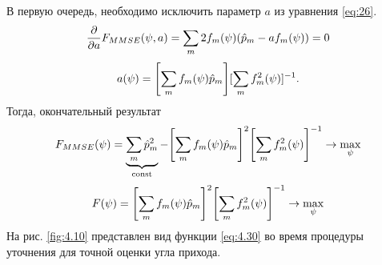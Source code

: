 В первую очередь, необходимо исключить параметр $a$ из уравнения \eqref{eq:26}.
\begin{equation}
    \pdv{a} F_{MMSE}(\psi, a) = \sum\limits_m 2f_m(\psi) (\hat p_m - a f_m(\psi)) = 0
\end{equation}
\begin{equation}
    a(\psi) = \qty[\sum\limits_m f_m(\psi) \hat p_m][\sum\limits_m f_m^2(\psi)]^{-1}.
\end{equation}
Тогда, окончательный результат
\begin{equation}
    F_{MMSE}(\psi)=\underbrace{\sum\limits_m \hat p_m^2}_{\text{const}} - \qty[\sum\limits_m f_m(\psi) \hat p_m]^2 \qty[\sum \limits_m f_m^2 (\psi)]^{-1} \to \max_{\psi}
\end{equation}
\begin{equation}
    \label{eq:4.30}
    F(\psi)=\qty[\sum\limits_m f_m(\psi) \hat p_m]^2 \qty[\sum \limits_m f_m^2 (\psi)]^{-1} \to \max_{\psi}
\end{equation}
На рис. \ref{fig:4.10} представлен вид функции \eqref{eq:4.30} во время процедуры уточнения для точной оценки угла прихода.

